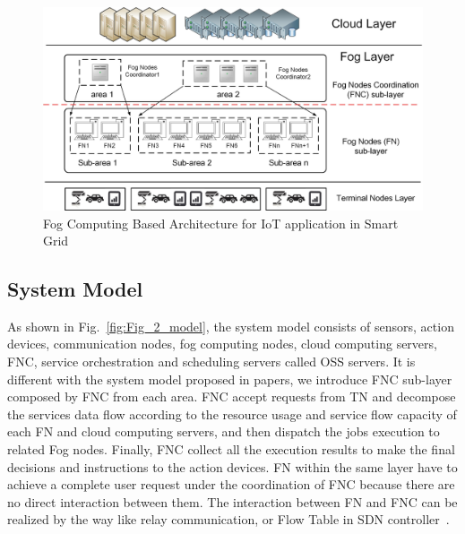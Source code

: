 \documentclass[conference]{IEEEtran}
\begin{document}
\begin{figure}[h]
	\centering\includegraphics[width=3.4 in]{figures/Fig_1_architecture} 
	\caption{Fog Computing Based Architecture for IoT application in Smart Grid}\label{fig:Fig_1_architecture} %
\end{figure}




\subsection{System Model}
As shown in Fig.~\ref{fig:Fig_2_model}, the system model consists of sensors, action devices, communication nodes, fog computing nodes, cloud computing servers, FNC, service orchestration and scheduling servers called OSS servers. It is different with the system model proposed in papers, we introduce FNC sub-layer composed by FNC from each area. FNC accept requests from TN and decompose the services data flow according to the resource usage and service flow capacity of each FN and cloud computing servers, and then dispatch the jobs execution to related Fog nodes. Finally, FNC collect all the execution results to make the final decisions and instructions to the action devices. FN within the same layer have to achieve a complete user request under the coordination of FNC because there are no direct interaction between them. The interaction between FN and FNC can be realized by the way like relay communication, or Flow Table in SDN controller~\cite{Yiming2016}. 
\end{document}
